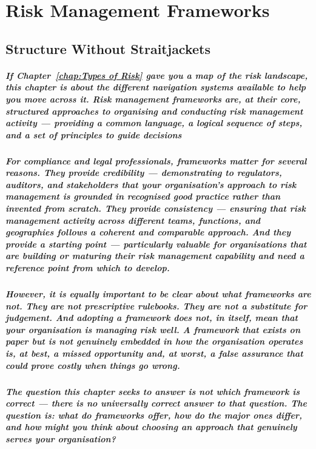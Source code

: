 \chapter{Risk Management Frameworks}
\label{chap:Risk Management Frameworks}

\section{Structure Without Straitjackets}
\paragraph{If Chapter~\ref{chap:Types of Risk} gave you a map of the risk landscape, this chapter is about the different navigation systems available to help you move across it. Risk management frameworks are, at their core, structured approaches to organising and conducting risk management activity — providing a common language, a logical sequence of steps, and a set of principles to guide decisions}
\paragraph{For compliance and legal professionals, frameworks matter for several reasons. They provide \textbf{credibility} — demonstrating to regulators, auditors, and stakeholders that your organisation's approach to risk management is grounded in recognised good practice rather than invented from scratch. They provide \textbf{consistency} — ensuring that risk management activity across different teams, functions, and geographies follows a coherent and comparable approach. And they provide a \textbf{starting point} — particularly valuable for organisations that are building or maturing their risk management capability and need a reference point from which to develop.}
\paragraph{However, it is equally important to be clear about what frameworks are not. They are not prescriptive rulebooks. They are not a substitute for judgement. And adopting a framework does not, in itself, mean that your organisation is managing risk well. A framework that exists on paper but is not genuinely embedded in how the organisation operates is, at best, a missed opportunity and, at worst, a false assurance that could prove costly when things go wrong.}
\paragraph{The question this chapter seeks to answer is not \textit{which framework is correct} — there is no universally correct answer to that question. The question is: \textit{what do frameworks offer, how do the major ones differ, and how might you think about choosing an approach that genuinely serves your organisation}?}

